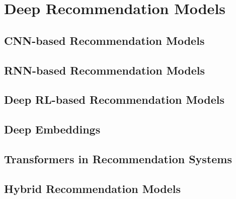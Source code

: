 %
%
%
\chapter{Deep Recommendation Models}
\label{intro} %


\section{CNN-based Recommendation Models}

\section{RNN-based Recommendation Models}

\section{Deep RL-based Recommendation Models}

\section{Deep Embeddings}

\section{Transformers in Recommendation Systems}

\section{Hybrid Recommendation Models}


